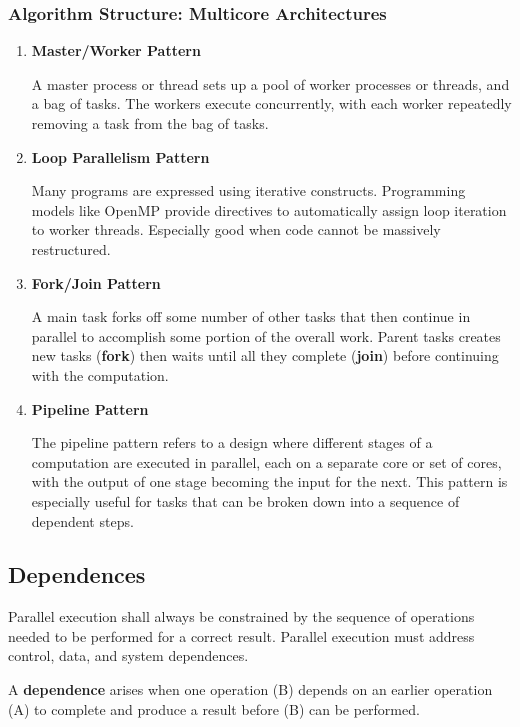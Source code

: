 \subsubsection{Algorithm Structure: Multicore Architectures}
\begin{enumerate}
    \item \textbf{Master/Worker Pattern}
    \par A master process or thread sets up a pool of worker processes or threads, and a bag of tasks. The workers execute concurrently, with each worker repeatedly removing a task from the bag of tasks.
    \item \textbf{Loop Parallelism Pattern}
    \par Many programs are expressed using iterative constructs. Programming models like OpenMP provide directives to automatically assign loop iteration to worker threads. Especially good when code cannot be massively restructured.
    \item \textbf{Fork/Join Pattern} \label{forkjoin}
    \par A main task forks off some number of other tasks that then
continue in parallel to accomplish some portion of the overall
work. Parent tasks creates new tasks (\textbf{fork}) then waits until all they
complete (\textbf{join}) before continuing with the computation.
%
\clearpage
%
\item \textbf{Pipeline Pattern} \label{pipeline}
\par The pipeline pattern refers to a design where different stages of a computation are executed in parallel, each on a separate core or set of cores, with the output of one stage becoming the input for the next. This pattern is especially useful for tasks that can be broken down into a sequence of dependent steps.
\end{enumerate}
%
%
%
%
%
\subsection{Dependences}
\par Parallel execution shall always be constrained by the sequence of operations needed to be performed for a correct result. Parallel execution must address control, data, and system dependences.
\par A \textbf{dependence} arises when one operation (B) depends on an earlier operation (A) to complete and produce a result before (B) can be performed.
